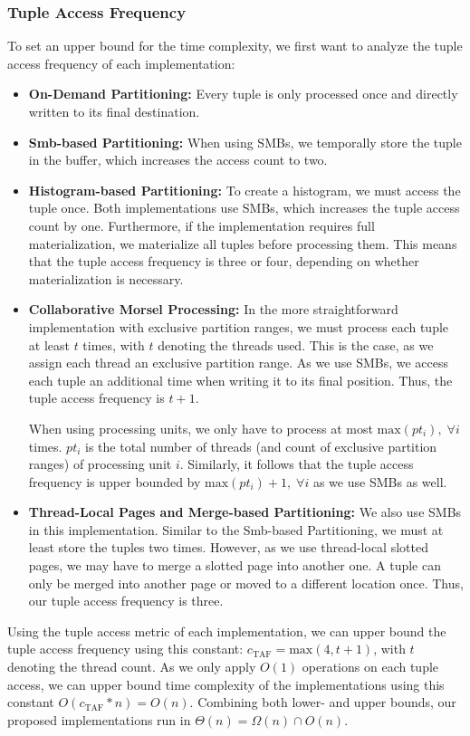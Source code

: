 \subsubsection{Tuple Access Frequency}
To set an upper bound for the time complexity, we first want to analyze the tuple access frequency of each implementation:
\begin{itemize}
  \item \textbf{On-Demand Partitioning:}
        Every tuple is only processed once and directly written to its final destination.
  \item \textbf{Smb-based Partitioning:}
        When using \acp{SMB}, we temporally store the tuple in the buffer, which increases the access count to two.
  \item \textbf{Histogram-based Partitioning:}
        To create a histogram, we must access the tuple once.
        Both implementations use \acp{SMB}, which increases the tuple access count by one.
        Furthermore, if the implementation requires full materialization, we materialize all tuples before processing them.
        This means that the tuple access frequency is three or four, depending on whether materialization is necessary.

  \item \textbf{Collaborative Morsel Processing:}
        In the more straightforward implementation with exclusive partition ranges, we must process each tuple at least $t$ times, with $t$ denoting the threads used.
        This is the case, as we assign each thread an exclusive partition range.
        As we use \acp{SMB}, we access each tuple an additional time when writing it to its final position.
        Thus, the tuple access frequency is $t + 1$.

        When using processing units, we only have to process at most $\textrm{max}(pt_i), \; \forall i$ times.
        $pt_i$ is the total number of threads (and count of exclusive partition ranges) of processing unit $i$.
        Similarly, it follows that the tuple access frequency is upper bounded by $\textrm{max}(pt_i) + 1, \; \forall i$ as we use \acp{SMB} as well.

  \item \textbf{Thread-Local Pages and Merge-based Partitioning:}
        We also use \acp{SMB} in this implementation.
        Similar to the Smb-based Partitioning, we must at least store the tuples two times.
        However, as we use thread-local slotted pages, we may have to merge a slotted page into another one.
        A tuple can only be merged into another page or moved to a different location once.
        Thus, our tuple access frequency is three.
\end{itemize}
Using the tuple access metric of each implementation, we can upper bound the tuple access frequency using this constant: $c_\textrm{TAF} = \textrm{max}(4, t+1)$, with $t$ denoting the thread count.
As we only apply $O(1)$ operations on each tuple access, we can upper bound time complexity of the implementations using this constant $O(c_\textrm{TAF} * n) = O(n)$.
Combining both lower- and upper bounds, our proposed implementations run in $\Theta(n) = \Omega(n) \cap O(n) $.
